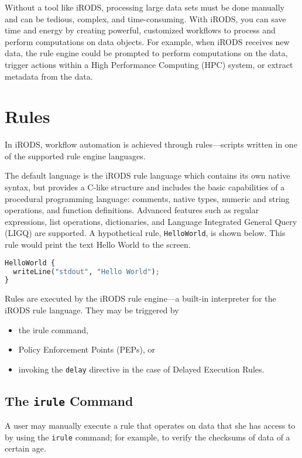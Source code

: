 \documentclass[10pt,oneside]{memoir}
\begin{document}
Without a tool like iRODS, processing large data sets must be done manually and can be tedious, complex, and time-consuming. With iRODS, you can save time and energy by creating powerful, customized workflows to process and perform computations on data objects. For example, when iRODS receives new data, the rule engine could be prompted to perform computations on the data, trigger actions within a High Performance Computing (HPC) system, or extract metadata from the data.

\section{Rules}

In iRODS, workflow automation is achieved through rules---scripts written in one of the supported rule engine languages.

The default language is the iRODS rule language which contains its own native syntax, but provides a C-like structure and includes the basic capabilities of a procedural programming language: comments, native types, numeric and string operations, and function definitions. Advanced features such as regular expressions, list operations, dictionaries, and Language Integrated General Query (LIGQ) are supported. A hypothetical rule, \texttt{HelloWorld}, is shown below. This rule would print the text Hello World to the screen.

\begin{lstlisting}[language=python]
HelloWorld {
  writeLine("stdout", "Hello World");
}
\end{lstlisting}

Rules are executed by the iRODS rule engine---a built-in interpreter for the iRODS rule language. They may be triggered by
\begin{itemize}
 \item the irule command,
 \item Policy Enforcement Points (PEPs), or
 \item invoking the \texttt{delay} directive in the case of Delayed Execution Rules.
\end{itemize}

\subsection{The \texttt{irule} Command}

A user may manually execute a rule that operates on data that she has access to by using the \texttt{irule} command; for example, to verify the checksums of data of a certain age.
\end{document}
